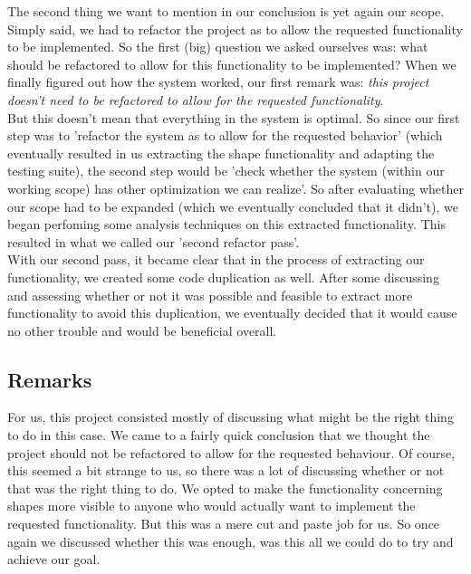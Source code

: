 \documentclass{article}
\begin{document}
The second thing we want to mention in our conclusion is yet again our scope. Simply said, we had to refactor the project as to allow the requested functionality to be implemented. So the first (big) question we asked ourselves was: what should be refactored to allow for this functionality to be implemented? When we finally figured out how the system worked, our first remark was: \textit{this project doesn't need to be refactored to allow for the requested functionality}.\\

But this doesn't mean that everything in the system is optimal. So since our first step was to 'refactor the system as to allow for the requested behavior' (which eventually resulted in us extracting the shape functionality and adapting the testing suite), the second step would be 'check whether the system (within our working scope) has other optimization we can realize'. So after evaluating whether our scope had to be expanded (which we eventually concluded that it didn't), we began perfoming some analysis techniques on this extracted functionality. This resulted in what we called our 'second refactor pass'.\\

With our second pass, it became clear that in the process of extracting our functionality, we created some code duplication as well. After some discussing and assessing whether or not it was possible and feasible to extract more functionality to avoid this duplication, we eventually decided that it would cause no other trouble and would be beneficial overall.

\subsection{Remarks}

For us, this project consisted mostly of discussing what might be the right thing to do in this case. We came to a fairly quick conclusion that we thought the project should not be refactored to allow for the requested behaviour. Of course, this seemed a bit strange to us, so there was a lot of discussing whether or not that was the right thing to do. We opted to make the functionality concerning shapes more visible to anyone who would actually want to implement the requested functionality. But this was a mere cut and paste job for us. So once again we discussed whether this was enough, was this all we could do to try and achieve our goal.\\
\end{document}
